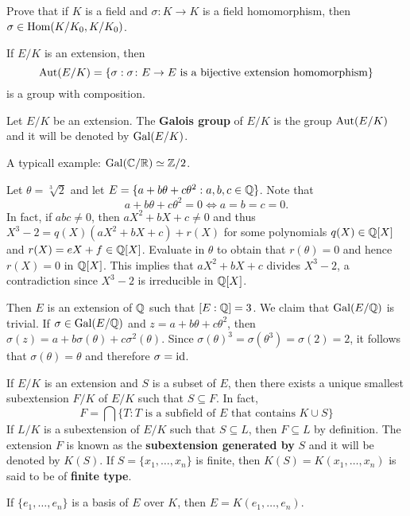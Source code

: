 \begin{exercise}
	Prove that if $K$ is a field and $\sigma\colon K\to K$ is a field homomorphism, 
then $\sigma\in\operatorname{Hom}(K/K_0,K/K_0)$. 
\end{exercise}

If $E/K$ is an extension, then
\[
	\operatorname{Aut}(E/K)=\{\sigma:\sigma\colon E\to E\text{ is a bijective extension homomorphism}\}
\]
is a group with composition.

\begin{definition}
	Let $E/K$ be an extension. The \textbf{Galois group}
	of $E/K$ is the group
	$\operatorname{Aut}(E/K)$ and it will be denoted by $\operatorname{Gal}(E/K)$. 
\end{definition}

A typicall example: $\operatorname{Gal}(\mathbb{C}/\mathbb{R})\simeq\mathbb{Z}/2$. 

\begin{example}
	Let $\theta=\sqrt[3]{2}$ and let $E=\{a+b\theta+c\theta^2:a,b,c\in\mathbb{Q}\}$. Note that 
\[
	a+b\theta+c\theta^2=0 \Longleftrightarrow a=b=c=0. 
\]
In fact, if $abc\ne 0$, then $aX^2+bX+c\ne 0$ and 
thus $X^3-2=q(X)(aX^2+bX+c)+r(X)$ for some polynomials
$q(X)\in\mathbb{Q}[X]$ and $r(X)=eX+f\in\mathbb{Q}[X]$. Evaluate in $\theta$ 
to obtain that $r(\theta)=0$ and hence $r(X)=0$ in $\mathbb{Q}[X]$. This implies  
that $aX^2+bX+c$ divides $X^3-2$, a contradiction since
$X^3-2$ is irreducible in $\mathbb{Q}[X]$. 

Then $E$ is an extension of $\mathbb{Q}$ such that $[E:\mathbb{Q}]=3$. We claim
that $\operatorname{Gal}(E/\mathbb{Q})$ is trivial. If 
$\sigma\in\operatorname{Gal}(E/\mathbb{Q})$ and $z=a+b\theta+c\theta^2$, then
$\sigma(z)=a+b\sigma(\theta)+c\sigma^2(\theta)$. Since
$\sigma(\theta)^3=\sigma(\theta^3)=\sigma(2)=2$, it follows
that $\sigma(\theta)=\theta$ and therefore
$\sigma=\operatorname{id}$. 
\end{example}

If $E/K$ is an extension and $S$ is a subset of $E$, then
there exists a unique smallest 
subextension $F/K$ of $E/K$ such that
$S\subseteq F$. In fact, 
\[
	F=\bigcap\{T:\text{$T$ is a subfield of $E$ that contains $K\cup S$}\} 
\]
If $L/K$ is a subextension of $E/K$ such that 
$S\subseteq L$, then $F\subseteq L$ by definition. The 
extension $F$ is known as the \textbf{subextension generated by} 
$S$ and
it will be denoted by $K(S)$. 
If $S=\{x_1,\dots,x_n\}$ is finite,
then $K(S)=K(x_1,\dots,x_n)$ is said to be of \textbf{finite type}. 

\begin{example}
	If $\{e_1,\dots,e_n\}$ is a basis of $E$ over $K$, 
	then $E=K(e_1,\dots,e_n)$. 
\end{example}

